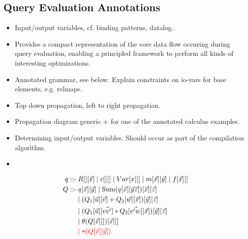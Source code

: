 \subsection{Query Evaluation Annotations}

\begin{itemize}
  \item Input/output variables, cf. binding patterns, datalog.
  \item Provides a compact representation of the core data flow occuring during
        query evaluation, enabling a principled framework to perform all kinds
        of interesting optimizations.
  \item Annotated grammar, see below. Explain constraints on io-vars for
        base elements, e.g. relmaps. 
  \item Top down propagation, left to right propagation.
  \item Propagation diagram generic + for one of the annotated calculus
        examples.
  \item Determining input/output variables. Should occur as part of the
       compilation algorithm. 
  \item {} 
\end{itemize}

\begin{align*} 
\q \; \mbox{::-} & \; R[][\vec{x}] \;|\; c[][] \;|\; Var[x][] \;|\;
m[\vec{x}][\vec{y}]\;|\; f[\vec{x}][]
\\
\comment{
& \;|\; \theta[x,y][] \;|\; \theta_c[x][] \;|\;
\calceq_\q[][y] \;|\; \calceq[x][y]
\\
}
\qq \; \mbox{::-} & \; \q[\vec{x}][\vec{y}] \;|\;
\calcsum(\q[\vec{x}][\vec{y}\vec{z}])[\vec{x}][\vec{z}] \\ & \;|\;
(\qqa[\vec{u}][\vec{v}] + \qqb[\vec{w}][\vec{x}])[\vec{y}][\vec{z}]
\\
& \;|\;
(\qqa[\vec{u}][\vec{vv'}] * \qqb[\vec{v'w}][\vec{x}])[\vec{y}][\vec{z}]
\\
& \;|\; \theta(\qq[\vec{x}][])[\vec{x}][]
\\
& \todo{\;|\; \calceq(\qq[\vec{x}][\vec{y}])}
\end{align*}

